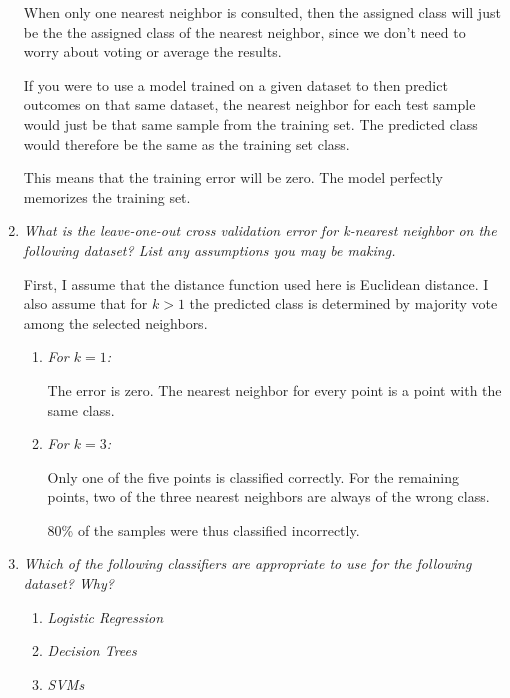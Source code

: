 \documentclass{article}
\begin{document}
\begin{enumerate}
        When only one nearest neighbor is consulted, then the assigned class
        will just be the the assigned class of the nearest neighbor, since we
        don't need to worry about voting or average the results.

        If you were to use a model trained on a given dataset to then predict
        outcomes on that same dataset, the nearest neighbor for each test
        sample would just be that same sample from the training set. The
        predicted class would therefore be the same as the training set class.

        This means that the training error will be zero. The model perfectly
        memorizes the training set.

    \item \textit{What is the leave-one-out cross validation error for
        k-nearest neighbor on the following dataset? List any assumptions you
        may be making.}

        First, I assume that the distance function used here is Euclidean
        distance. I also assume that for $k > 1$ the predicted class is
        determined by majority vote among the selected neighbors.

        \begin{enumerate}
            \item \textit{For $k = 1$:}

                The error is zero. The nearest neighbor for every point is a
                point with the same class.

            \item \textit{For $k = 3$:}

                Only one of the five points is classified correctly. For the
                remaining points, two of the three nearest neighbors are always
                of the wrong class.

                80\% of the samples were thus classified incorrectly.
        \end{enumerate}

    \item \textit{Which of the following classifiers are appropriate to use for
        the following dataset? Why?}

        \begin{enumerate}
            \item \textit{Logistic Regression}
            \item \textit{Decision Trees}
            \item \textit{SVMs}
        \end{enumerate}


\end{enumerate}
\end{document}
